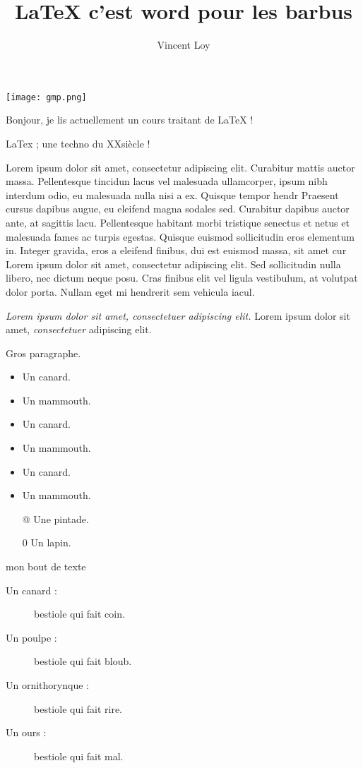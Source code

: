 \documentclass{letter}
\title{LaTeX c'est word pour les barbus}
\author{Vincent Loy}
\begin{document}
\texttt{[image: gmp.png]}  

Bonjour, je lis actuellement un cours traitant de LaTeX !

LaTex ; une techno du \textsc{XX} siècle !

Lorem ipsum dolor sit amet, consectetur adipiscing elit. Curabitur mattis auctor massa. Pellentesque tincidun 
lacus vel malesuada ullamcorper, ipsum nibh interdum odio, eu malesuada nulla nisi a ex. Quisque tempor hendr 
Praesent cursus dapibus augue, eu eleifend magna sodales sed. Curabitur dapibus auctor ante, at sagittis lacu. 
Pellentesque habitant morbi tristique senectus et netus et malesuada fames ac turpis egestas. Quisque euismod 
sollicitudin eros elementum in. Integer gravida, eros a eleifend finibus, dui est euismod massa, sit amet cur
Lorem ipsum dolor sit amet, consectetur adipiscing elit. Sed sollicitudin nulla libero, nec dictum neque posu. 
Cras finibus elit vel ligula vestibulum, at volutpat dolor porta. Nullam eget mi hendrerit sem vehicula iacul.

\textit{Lorem ipsum dolor sit amet, \emph{consectetuer} adipiscing elit.}
Lorem ipsum dolor sit amet, \emph{consectetuer} adipiscing elit.


Gros paragraphe.

\begin{itemize}

\item Un canard.
\item Un mammouth.
\item Un canard.
\item Un mammouth.
\item Un canard.
\item Un mammouth.
\item[@] Une pintade. %
\item[0] Un lapin.

\end{itemize}

{\selectfont mon bout de texte}


\begin{description}
\item[Un canard :] bestiole qui fait coin.
\item[Un poulpe :] bestiole qui fait bloub.
\item[Un ornithorynque :] bestiole qui fait rire.
\item[Un ours :] bestiole qui fait mal.
\end{description}
\end{document}
